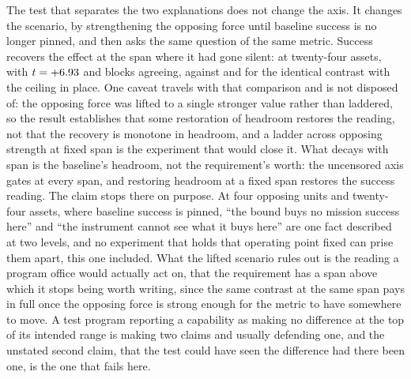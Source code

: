 \documentclass[11pt]{article}
\begin{document}
The test that separates the two explanations does not change the axis. It changes the scenario, by strengthening the opposing force until baseline success is no longer pinned, and then asks the same question of the same metric. Success recovers the effect at the span where it had gone silent: \LsLiftedTwentyFour{} at twenty-four assets, \LsLiftedTwentyFourV{} with $t = +6.93{}$ and \LsLiftedTwentyFourBlocks{} blocks agreeing, against \LsSuccTwentyFour{} and \LsSuccTwentyFourBlocks{} for the identical contrast with the ceiling in place. One caveat travels with that comparison and is not disposed of: the opposing force was lifted to a single stronger value rather than laddered, so the result establishes that some restoration of headroom restores the reading, not that the recovery is monotone in headroom, and a ladder across opposing strength at fixed span is the experiment that would close it. What decays with span is the baseline's headroom, not the requirement's worth: the uncensored axis gates at every span, and restoring headroom at a fixed span restores the success reading. The claim stops there on purpose. At four opposing units and twenty-four assets, where baseline success is pinned, ``the bound buys no mission success here'' and ``the instrument cannot see what it buys here'' are one fact described at two levels, and no experiment that holds that operating point fixed can prise them apart, this one included. What the lifted scenario rules out is the reading a program office would actually act on, that the requirement has a span above which it stops being worth writing, since the same contrast at the same span pays in full once the opposing force is strong enough for the metric to have somewhere to move. A test program reporting a capability as making no difference at the top of its intended range is making two claims and usually defending one, and the unstated second claim, that the test could have seen the difference had there been one, is the one that fails here.
\end{document}
